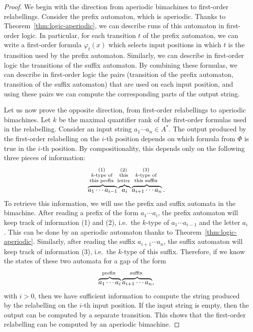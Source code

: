 \begin{proof}
    We begin with the direction from aperiodic bimachines to first-order relabellings. Consider the prefix automaton, which is aperiodic. 
    Thanks to Theorem~\ref{thm:logic-aperiodic}, we can describe runs of this automaton in first-order logic. In particular, for each transition $t$ of the prefix automaton, we can write a first-order formula $\varphi_t(x)$ which selects input positions in which $t$ is the transition used by the  prefix automaton. Similarly, we can describe in first-order logic the transitions of the suffix automaton. By combining these formulas, we can describe in first-order logic the pairs (transition of the prefix automaton, transition of the suffix automaton) that are used on each input position, and using these pairs we can compute the corresponding parts of the output string. 
    
    Let us now prove the opposite direction, from first-order relabellings to aperiodic bimachines. Let $k$ be the maximal quantifier rank of the first-order formulas used in the relabelling. Consider an input string $a_1 \cdots a_n \in A^*$. The output produced by the first-order relabelling on the $i$-th position depends on which formula from $\Phi$ is true in the $i$-th position. By compositionality, this  depends only on the following three pieces of information:
    \begin{align*}
    \myoverbrace{a_1 \cdots a_{i-1}}{(1) \\ $k$-type of \\ this prefix}
    \myoverbrace{a_i}{(2) \\ this \\ letter}
    \myoverbrace{a_{i+1} \cdots a_n}{(3) \\ $k$-type of \\ this suffix}.
    \end{align*}
    To retrieve this information, we will use the prefix and suffix automata in the bimachine. After reading a prefix of the form $a_1 \cdots a_{i}$, the prefix automaton will keep track of information (1) and (2), i.e.~the $k$-type of $a_1 \cdots a_{i-1}$ and the letter $a_i$. This can be done by an aperiodic automaton thanks to Theorem~\ref{thm:logic-aperiodic}. Similarly, after reading the suffix $a_{i+1} \cdots a_n$, the suffix automaton will keep track of information (3), i.e.~the $k$-type of this suffix. Therefore, if we know the states of these two automata for a gap of the form 
    \begin{align*}
    \myoverbrace{a_1 \cdots a_i}{prefix}
    \myoverbrace{a_{i+1} \cdots a_n}{suffix},
    \end{align*}
    with $i > 0$,
    then we have sufficient information to compute the string produced by the relabelling on the $i$-th input position.  If the input string is empty, then the output can be computed by a separate transition. This shows that the first-order relabelling can be computed by an aperiodic bimachine.
\end{proof}
        

